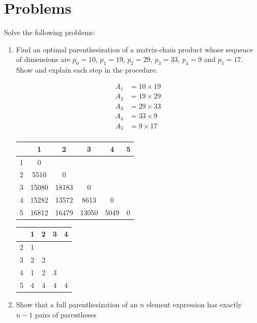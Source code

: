 \documentclass{article}
\begin{document}
\section{Problems}
Solve the following problems:
\begin{enumerate}
    \item  Find an optimal parenthesization of a matrix-chain product whose sequence of dimensions are $p_0= 10$, $p_1= 19$, $p_2= 29$, $p_3= 33$, $p_4= 9$ and $p_5= 17$. Show and explain each step in the procedure.

    \begin{align*}
        A_1 &= 10\times19\\
        A_2 &= 19\times29\\
        A_3 &= 29\times33\\
        A_4 &= 33\times9\\
        A_5 &= 9\times17\\
    \end{align*}
    \begin{center}
        \begin{tabular}{c|c|c|c|c|c|}
             & 1 & 2 & 3 & 4 & 5 \\
            \hline
            1& 0 & & & & \\
            \hline
            2& 5510 & 0 & & & \\
            \hline
            3& 15080 & 18183 & 0 & & \\
            \hline
            4& 15282 & 13572 & 8613 & 0 & \\
            \hline
            5& 16812 & 16479 & 13050 & 5049 & 0 \\
            \hline
        \end{tabular}

        \begin{tabular}{c|c|c|c|c|}
             & 1 & 2 & 3 & 4\\
            \hline
            2& 1 & & &  \\
            \hline
            3& 2 & 2 & &  \\
            \hline
            4& 1 & 2 & 3 &  \\
            \hline
            5& 4 & 4 & 4 & 4 \\
            \hline
        \end{tabular}
    \end{center}

    \item  Show that a full parenthesization of an $n$ element expression has exactly $n-1$ pairs of parentheses


\end{enumerate}
\end{document}
